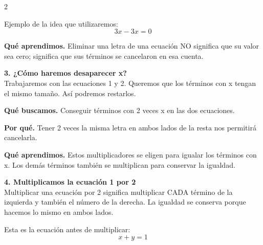 \documentclass[11pt,a4paper,landscape]{article}
\begin{document}
\begin{multicols*}{2}
\begin{minipage}{\linewidth}
\par\smallskip Ejemplo de la idea que utilizaremos:
\[3x-3x=0\]
\par\smallskip\textbf{Qué aprendimos.} Eliminar una letra de una ecuación NO significa que su valor sea cero; significa que sus términos se cancelaron en esa cuenta.
\end{minipage}\par\medskip
\noindent\begin{minipage}{\linewidth}\textbf{3. ¿Cómo haremos desaparecer x?}\\[2pt]Trabajaremos con las ecuaciones 1 y 2. Queremos que los términos con x tengan el mismo tamaño. Así podremos restarlos.
\par\smallskip\textbf{Qué buscamos.} Conseguir términos con 2 veces x en las dos ecuaciones.
\par\smallskip\textbf{Por qué.} Tener 2 veces la misma letra en ambos lados de la resta nos permitirá cancelarla.
\par{}\par\smallskip
\par\smallskip\textbf{Qué aprendimos.} Estos multiplicadores se eligen para igualar los términos con x. Los demás términos también se multiplican para conservar la igualdad.
\end{minipage}\par\medskip
\noindent\begin{minipage}{\linewidth}\textbf{4. Multiplicamos la ecuación 1 por 2}\\[2pt]Multiplicar una ecuación por 2 significa multiplicar CADA término de la izquierda y también el número de la derecha. La igualdad se conserva porque hacemos lo mismo en ambos lados.
\par\smallskip Esta es la ecuación antes de multiplicar:
\[x + y = 1\]
\par{}\par\smallskip

\end{minipage}
\end{multicols*}
\end{document}
